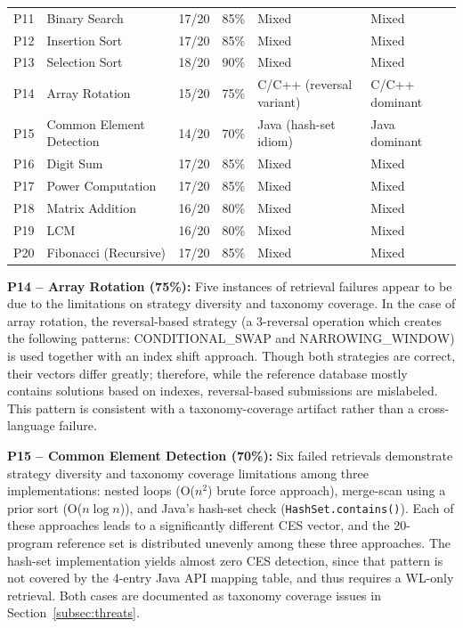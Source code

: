 \begin{table}[!t]
\begin{tabular}{|c|l|c|c|l|l|}
P11 & Binary Search               & 17/20 & 85\%  & Mixed                        & Mixed \\
P12 & Insertion Sort              & 17/20 & 85\%  & Mixed                        & Mixed \\
P13 & Selection Sort              & 18/20 & 90\%  & Mixed                        & Mixed \\
P14 & Array Rotation              & 15/20 & 75\%  & C/C++ (reversal variant)     & C/C++ dominant \\
P15 & Common Element Detection    & 14/20 & 70\%  & Java (hash-set idiom)        & Java dominant \\
P16 & Digit Sum                   & 17/20 & 85\%  & Mixed                        & Mixed \\
P17 & Power Computation           & 17/20 & 85\%  & Mixed                        & Mixed \\
P18 & Matrix Addition             & 16/20 & 80\%  & Mixed                        & Mixed \\
P19 & LCM                         & 16/20 & 80\%  & Mixed                        & Mixed \\
P20 & Fibonacci (Recursive)       & 17/20 & 85\%  & Mixed                        & Mixed \\
\hline
\end{tabular}
\end{table}

\textbf{P14 -- Array Rotation (75\%):} Five instances of retrieval failures appear to be due to the limitations on strategy diversity and taxonomy coverage. In the case of array rotation, the reversal-based strategy (a 3-reversal operation which creates the following patterns: CONDITIONAL\_SWAP and NARROWING\_WINDOW) is used together with an index shift approach. Though both strategies are correct, their vectors differ greatly; therefore, while the reference database mostly contains solutions based on indexes, reversal-based submissions are mislabeled. This pattern is consistent with a taxonomy-coverage artifact rather than a cross-language failure.

\textbf{P15 -- Common Element Detection (70\%):} Six failed retrievals demonstrate strategy diversity and taxonomy coverage limitations among three implementations: nested loops (O($n^2$) brute force approach), merge-scan using a prior sort (O($n \log n$)), and Java's hash-set check (\texttt{HashSet.contains()}). Each of these approaches leads to a significantly different CES vector, and the 20-program reference set is distributed unevenly among these three approaches. The hash-set implementation yields almost zero CES detection, since that pattern is not covered by the 4-entry Java API mapping table, and thus requires a WL-only retrieval. Both cases are documented as taxonomy coverage issues in Section~\ref{subsec:threats}.

